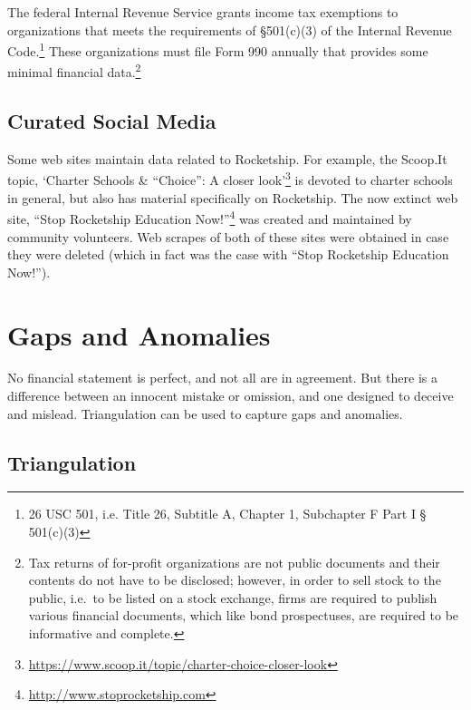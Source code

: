The federal Internal Revenue Service grants income tax exemptions to organizations that meets the requirements of §501(c)(3) of the  Internal Revenue Code.\footnote{26 USC 501, i.e. Title 26, Subtitle A, Chapter 1, Subchapter F Part I § 501(c)(3)} These organizations must file Form 990 annually that provides some minimal financial data.\footnote{Tax returns of for-profit organizations are not public documents and their contents do not have to be disclosed; however, in order to sell stock to the public, i.e.~to be listed on a stock exchange, firms are required to publish various financial documents, which like bond prospectuses, are required to be informative and complete.} %

\subsection{Curated Social Media}\label{sec:curated-social-media}\indent%

Some web sites maintain data related to Rocketship. For example, the Scoop.It topic, `Charter Schools \& ``Choice'': A closer look'\footnote{\url{https://www.scoop.it/topic/charter-choice-closer-look}} is devoted to charter schools in general, but also has material specifically on Rocketship. The now extinct web site, ``Stop Rocketship Education Now!''\footnote{\url{http://www.stoprocketship.com}} was created and maintained by community volunteers. Web scrapes of both of these sites were obtained in case they were deleted (which in fact was the case with ``Stop Rocketship Education Now!'').

\section{Gaps and Anomalies}\label{sec:gaps-anomalies}\indent%

No financial statement is perfect, and not all are in agreement. But there is a difference between an innocent mistake or omission, and one designed to deceive and mislead. Triangulation can be used to capture gaps and anomalies.

\subsection{Triangulation}\label{sec:triangulation}\indent%

